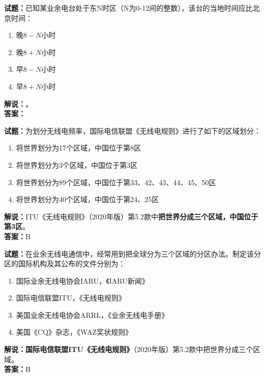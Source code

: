 \documentclass{ctexbook}
\begin{document}
\bigskip

\noindent\textbf{试题：}已知某业余电台处于东N时区（N为0-12间的整数），该台的当地时间应比北京时间：
\begin{enumerate}[leftmargin=3em]
  \item 晚\(8-N\)小时
  \item 晚\(8+N\)小时
  \item 早\(8-N\)小时
  \item 早\(8+N\)小时
\end{enumerate}
\noindent\textbf{解说：}\textbf{}。\\\noindent\textbf{答案：}

\bigskip

\noindent\textbf{试题：}为划分无线电频率，国际电信联盟《无线电规则》进行了如下的区域划分：
\begin{enumerate}[leftmargin=3em]
  \item 将世界划分为17个区域，中国位于第8区
  \item 将世界划分为3个区域，中国位于第3区
  \item 将世界划分为89个区域，中国位于第33、42、43、44、45、50区
  \item 将世界划分为40个区域，中国位于第24、25区
\end{enumerate}
\noindent\textbf{解说：}ITU《无线电规则》（2020年版）第5.2款中\textbf{把世界分成三个区域，中国位于第3区}。\\\noindent\textbf{答案：}B

\bigskip

\noindent\textbf{试题：}在业余无线电通信中，经常用到把全球分为三个区域的分区办法。制定该分区的国际机构及其公布的文件分别为：
\begin{enumerate}[leftmargin=3em]
  \item 国际业余无线电协会IARU，《IARU新闻》
  \item 国际电信联盟ITU，《无线电规则》
  \item 美国业余无线电协会ARRL，《业余无线电手册》
  \item 美国《CQ》杂志，《WAZ奖状规则》
\end{enumerate}
\noindent\textbf{解说：}\textbf{国际电信联盟ITU《无线电规则》}（2020年版）第5.2款中把世界分成三个区域。\\\noindent\textbf{答案：}B

\bigskip
\end{document}
